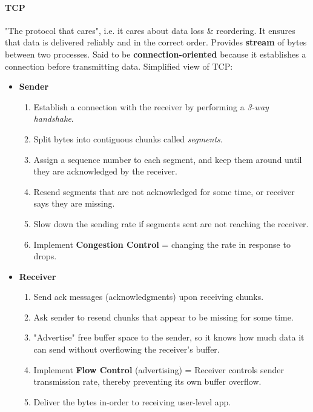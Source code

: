 \documentclass[openany,12pt]{book}
\begin{document}
\paragraph{TCP} "The protocol that cares", i.e. it cares about data loss \& reordering. It ensures that data is delivered reliably and in the correct order. Provides \textbf{stream} of bytes between two processes. Said to be \textbf{connection-oriented} because it establishes a connection before transmitting data. Simplified view of TCP:
\begin{itemize}
  \item \textbf{Sender}
        \begin{enumerate}
          \item Establish a connection with the receiver by performing a \textit{3-way handshake}.
          \item Split bytes into contiguous chunks called \textit{segments}.
          \item Assign a sequence number to each segment, and keep them around until they are acknowledged by the receiver.
          \item Resend segments that are not acknowledged for some time, or receiver says they are missing.
          \item Slow down the sending rate if segments sent are not reaching the receiver.
          \item Implement \textbf{Congestion Control} = changing the rate in response to drops.
        \end{enumerate}
  \item \textbf{Receiver}
        \begin{enumerate}
          \item Send ack messages (acknowledgments) upon receiving chunks.
          \item Ask sender to resend chunks that appear to be missing for some time.
          \item "Advertise" free buffer space to the sender, so it knows how much data it can send without overflowing the receiver's buffer.
          \item Implement \textbf{Flow Control} (advertising) = Receiver controls sender transmission rate, thereby preventing its own buffer overflow.
          \item Deliver the bytes in-order to receiving user-level app.
        \end{enumerate}
\end{itemize}
\end{document}
